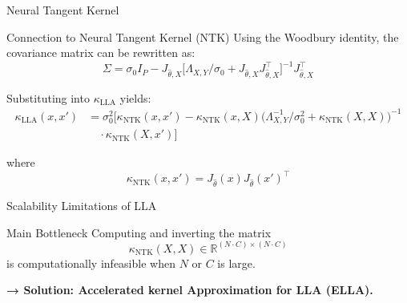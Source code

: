 \documentclass{beamer}
\begin{document}
\begin{frame}{Neural Tangent Kernel}

\begin{block}{Connection to Neural Tangent Kernel (NTK)}
Using the Woodbury identity, the covariance matrix can be rewritten as:
$$
\Sigma = \sigma_0 I_P - J_{\hat{\theta}, X}
\Big[
\Lambda_{X,Y}/\sigma_0 + J_{\hat{\theta}, X}J_{\hat{\theta}, X}^\top
\Big]^{-1}
J_{\hat{\theta}, X}^\top
$$

Substituting into $\kappa_{\text{LLA}}$ yields:
\begin{align*}
\kappa_{\text{LLA}}(x, x')
&= \sigma_0^2 \Big[
      \kappa_{\text{NTK}}(x, x')
      - 
      \kappa_{\text{NTK}}(x, X)
      \Big(
          \Lambda_{X,Y}^{-1}/\sigma_0^2 
          + \kappa_{\text{NTK}}(X, X)
      \Big)^{-1} \\
&\quad \cdot 
      \kappa_{\text{NTK}}(X, x')
   \Big]
\end{align*}



where
$$
\kappa_{\text{NTK}}(x, x') = J_{\hat{\theta}}(x)J_{\hat{\theta}}(x')^\top
$$

\end{block}


\end{frame}



\begin{frame}{Scalability Limitations of LLA}

\begin{block}{Main Bottleneck}
Computing and inverting the matrix
$$
\kappa_{\text{NTK}}(X, X) \in \mathbb{R}^{(N \cdot C) \times (N \cdot C)}
$$
is computationally infeasible when $N$ or $C$ is large.
\end{block}

\vspace{0.3cm}

\textbf{→ Solution: Accelerated kernel Approximation for LLA (ELLA).}

\end{frame}
\end{document}
